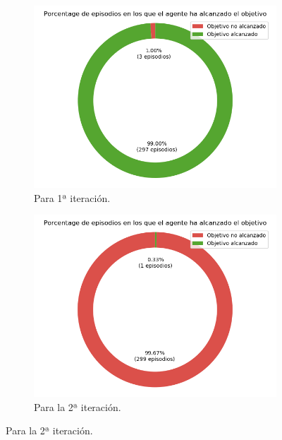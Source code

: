 \begin{figure}
    \centering
    \begin{subfigure}{.5\textwidth}
        \centering
        \includegraphics[scale=0.3]{cap5_experimentacion/images/CHANGE_GOAL-20_09-21_30-0, 2, 1_it1_porcentajeResuelto.png}
        \caption{Para 1ª iteración.}
        \label{fig:CHANGE_GOAL-20_09-21_30-0, 2, 1_it1_porcentajeResuelto}
    \end{subfigure}%
    \begin{subfigure}{.5\textwidth}
        \centering
        \includegraphics[scale=0.3]{cap5_experimentacion/images/CHANGE_GOAL-20_09-21_30-0, 2, 1_it2_porcentajeResuelto.png}
        \caption{Para la 2ª iteración.}
        \label{fig:CHANGE_GOAL-20_09-21_30-0, 2, 1_it2_porcentajeResuelto}

\end{subfigure}
\end{figure}
